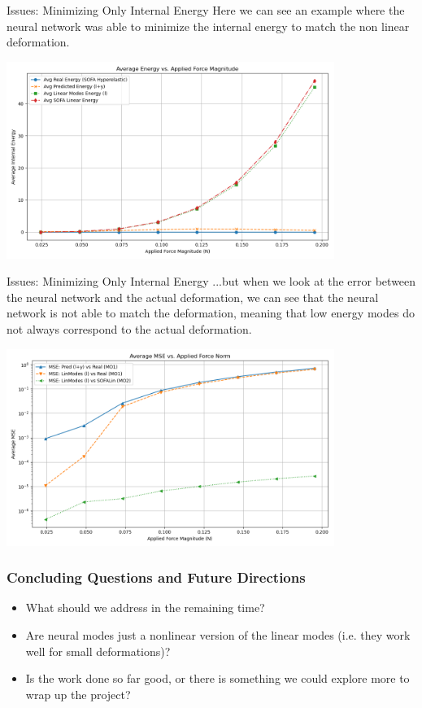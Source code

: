 \documentclass{beamer}
\begin{document}
\begin{frame}{Issues: Minimizing Only Internal Energy}
 Here we can see an example where the neural network was able to minimize the internal energy to match the non linear deformation.
        \begin{centering}
            \includegraphics[width=0.8\textwidth]{Images/avg_energy_vs_force.png}
        \end{centering}
\end{frame}

\begin{frame}{Issues: Minimizing Only Internal Energy}
    ...but when we look at the error between the neural network and the actual deformation, we can see that the neural network is not able to match the deformation, meaning that low energy modes do not always correspond to the actual deformation.
        \begin{centering}
            \includegraphics[width=0.8\textwidth]{Images/avg_mse_vs_force_norm.png}
        \end{centering}
\end{frame}




\begin{frame}
    \frametitle{Concluding Questions and Future Directions}
    \begin{itemize}
        \item What should we address in the remaining time?
        \item Are neural modes just a nonlinear version of the linear modes (i.e. they work well for small deformations)?
        \item Is the work done so far good, or there is something we could explore more to wrap up the project?
    \end{itemize}
\end{frame}
\end{document}
